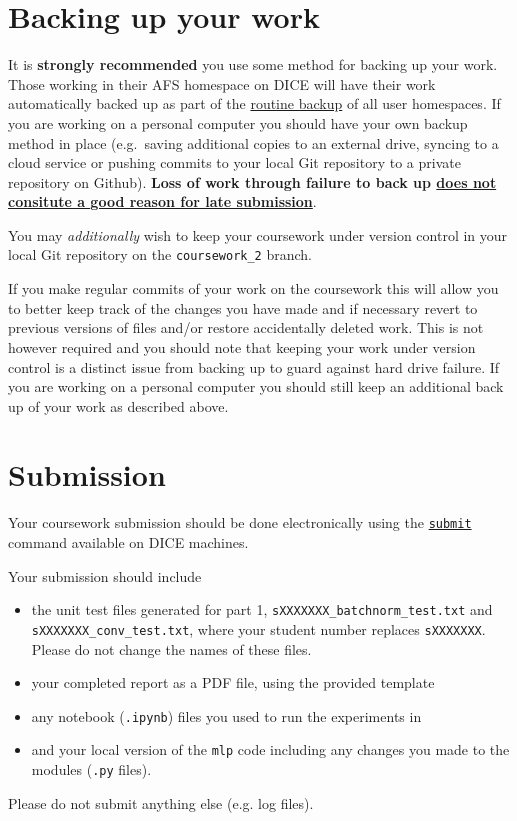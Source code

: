 \documentclass[11pt,]{article}
\begin{document}
\section{Backing up your work}
\label{sec:backing-up-your-work}

It is \textbf{strongly recommended} you use some method for backing up
your work. Those working in their AFS homespace on DICE will have their
work automatically backed up as part of the
\href{http://computing.help.inf.ed.ac.uk/backups-and-mirrors}{routine
backup} of all user homespaces. If you are working on a personal
computer you should have your own backup method in place (e.g.~saving
additional copies to an external drive, syncing to a cloud service or
pushing commits to your local Git repository to a private repository on
Github). \textbf{Loss of work through failure to back up
\href{http://tinyurl.com/edinflate}{does not consitute a good reason for
late submission}}.

You may \emph{additionally} wish to keep your coursework under version
control in your local Git repository on the \verb+coursework_2+ branch.

If you make regular commits of your work on the coursework this will
allow you to better keep track of the changes you have made and if
necessary revert to previous versions of files and/or restore
accidentally deleted work. This is not however required and you should
note that keeping your work under version control is a distinct issue
from backing up to guard against hard drive failure. If you are working
on a personal computer you should still keep an additional back up of
your work as described above.



\section{Submission}
\label{sec:submission}

Your coursework submission should be done electronically using the
\href{http://computing.help.inf.ed.ac.uk/submit}{\texttt{submit}}
command available on DICE machines.

Your submission should include

\begin{itemize}
\itemsep1pt\parskip0pt
\item
  the unit test files generated for part 1, \verb+sXXXXXXX_batchnorm_test.txt+ and \verb+sXXXXXXX_conv_test.txt+, where your student number replaces \verb+sXXXXXXX+.  Please do not 
  change the names of these files.
\item
  your completed report as a PDF file, using the provided template
\item
  any notebook (\verb+.ipynb+) files you used to run the experiments in
\item
  and your local version of the \texttt{mlp} code including any changes
  you made to the modules (\texttt{.py} files).
\end{itemize}
Please do not submit anything else (e.g. log files).
\end{document}
